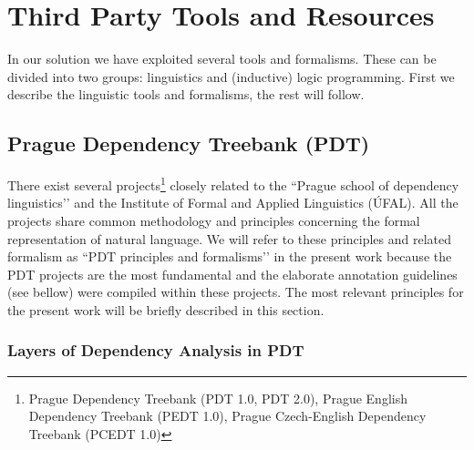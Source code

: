 \chapter{Third Party Tools and Resources}

\graphicspath{{../img/ch30/}}


In our solution we have exploited several tools and formalisms. These can be divided into two groups: linguistics and (inductive) logic programming. First we describe the linguistic tools and formalisms, the rest will follow.



\section{Prague Dependency Treebank (PDT)}
There exist several projects\footnote{Prague Dependency Treebank (PDT 1.0, PDT 2.0), Prague English Dependency Treebank (PEDT 1.0), Prague Czech-English Dependency Treebank (PCEDT 1.0)} closely related to the ``Prague school of dependency linguistics’’ and the Institute of Formal and Applied Linguistics (ÚFAL). All the projects share common methodology and principles concerning the formal representation of natural language. We will refer to these principles and related formalism as ``PDT principles and formalisms’’ in the present work because the PDT projects are the most fundamental and the elaborate annotation guidelines (see bellow) were compiled within these projects. The most relevant principles for the present work will be briefly described in this section.

\subsection{Layers of Dependency Analysis in PDT}

